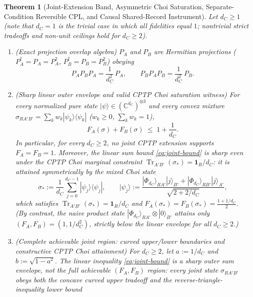 \documentclass[11pt,a4paper]{article}
\newtheorem{theorem}{Theorem}
\theoremstyle{definition}
\theoremstyle{remark}
\newcommand{\Tr}{\operatorname{Tr}}
\newcommand{\bbC}{\mathbb{C}}
\newcommand{\1}{\mathbf{1}}
\begin{document}
\begin{theorem}[Joint-Extension Band, Asymmetric Choi Saturation, Separate-Condition Reversible CPL, and Causal Shared-Record Instrument]\label{thm:cpl}
Let $d_C \ge 1$ (note that $d_C = 1$ is the trivial case in which all fidelities equal $1$; nontrivial strict tradeoffs and non-unit ceilings hold for $d_C \ge 2$).
\begin{enumerate}
  \item[(a)] \emph{(Exact projection overlap algebra)} $P_A$ and $P_B$ are Hermitian projections ($P_A^\dagger = P_A = P_A^2$, $P_B^\dagger = P_B = P_B^2$) obeying
  \begin{equation}\label{eq:papbpa}
    P_A P_B P_A = \frac{1}{d_C^2}\, P_A, \qquad P_B P_A P_B = \frac{1}{d_C^2}\, P_B.
  \end{equation}
  \item[(b)] \emph{(Sharp linear outer envelope and valid CPTP Choi saturation witness)} For every normalized pure state $|\psi\rangle \in (\bbC^{d_C})^{\otimes 3}$ and every convex mixture $\sigma_{RA'B'} = \sum_k w_k |\psi_k\rangle\langle\psi_k|$ ($w_k \ge 0$, $\sum_k w_k = 1$),
  \begin{equation}\label{eq:joint-bound}
    F_A(\sigma) + F_B(\sigma) \;\le\; 1 + \frac{1}{d_C}.
  \end{equation}
  In particular, for every $d_C \ge 2$, no joint CPTP extension supports $F_A = F_B = 1$. Moreover, the linear sum bound \eqref{eq:joint-bound} is sharp even under the CPTP Choi marginal constraint $\Tr_{A'B'}(\sigma_*) = \1_R / d_C$: it is attained symmetrically by the mixed Choi state
  \begin{equation}\label{eq:choi-witness}
    \sigma_* := \frac{1}{d_C}\sum_{j=0}^{d_C-1} |\psi_j\rangle\langle\psi_j|, \qquad
    |\psi_j\rangle := \frac{|\Phi_{d_C}\rangle_{RA'}|j\rangle_{B'} + |\Phi_{d_C}\rangle_{RB'}|j\rangle_{A'}}{\sqrt{2 + 2/d_C}},
  \end{equation}
  which satisfies $\Tr_{A'B'}(\sigma_*) = \1_R / d_C$ and $F_A(\sigma_*) = F_B(\sigma_*) = \frac{1 + 1/d_C}{2}$. (By contrast, the naive product state $|\Phi_{d_C}\rangle_{RA'}\otimes |0\rangle_{B'}$ attains only $(F_A, F_B) = (1, 1/d_C^2)$, strictly below the linear envelope for all $d_C \ge 2$.)
  \item[(c)] \emph{(Complete achievable joint region: curved upper/lower boundaries \cite{Kay2009,Nechita2021} and constructive CPTP Choi attainment)} For $d_C \ge 2$, let $a := 1/d_C$ and $b := \sqrt{1 - a^2}$. The linear inequality \eqref{eq:joint-bound} is a sharp \emph{outer sum envelope}, not the full achievable $(F_A, F_B)$ region: every joint state $\sigma_{RA'B'}$ obeys both the concave curved upper tradeoff \cite[Eq.~(6)]{Kay2009} and the reverse-triangle-inequality lower bound

\end{enumerate}
\end{theorem}
\end{document}
